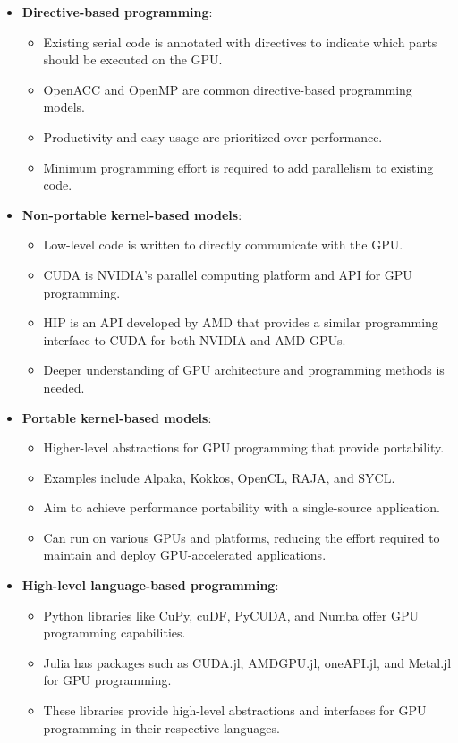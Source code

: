 \begin{itemize}
    \item \textbf{Directive-based programming}:
    \begin{itemize}
        \item Existing serial code is annotated with directives to indicate which parts should be executed on the GPU.
        \item OpenACC and OpenMP are common directive-based programming models.
        \item Productivity and easy usage are prioritized over performance.
        \item Minimum programming effort is required to add parallelism to existing code.
    \end{itemize}
    \item \textbf{Non-portable kernel-based models}:
    \begin{itemize}
        \item Low-level code is written to directly communicate with the GPU.
        \item CUDA is NVIDIA’s parallel computing platform and API for GPU programming.
        \item HIP is an API developed by AMD that provides a similar programming interface to CUDA for both NVIDIA and AMD GPUs.
        \item Deeper understanding of GPU architecture and programming methods is needed.
    \end{itemize}
    \item \textbf{Portable kernel-based models}:
    \begin{itemize}
        \item Higher-level abstractions for GPU programming that provide portability.
        \item Examples include Alpaka, Kokkos, OpenCL, RAJA, and SYCL.
        \item Aim to achieve performance portability with a single-source application.
        \item Can run on various GPUs and platforms, reducing the effort required to maintain and deploy GPU-accelerated applications.
    \end{itemize}
    \item \textbf{High-level language-based programming}:
    \begin{itemize}
        \item Python libraries like CuPy, cuDF, PyCUDA, and Numba offer GPU programming capabilities.
        \item Julia has packages such as CUDA.jl, AMDGPU.jl, oneAPI.jl, and Metal.jl for GPU programming.
        \item These libraries provide high-level abstractions and interfaces for GPU programming in their respective languages.
    \end{itemize}
\end{itemize}
